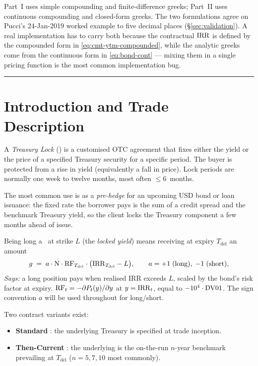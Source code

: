 \documentclass[11pt,a4paper]{article}
\newcommand{\Tlock}{\text{T-Lock}}
\newcommand{\RF}{\mathrm{RF}}
\newcommand{\Tdel}{T_{\mathrm{del}}}
\begin{document}
Part~I uses simple compounding and finite-difference greeks; Part~II
uses continuous compounding and closed-form greeks. The two
formulations agree on Pucci's 24-Jan-2019 worked example to five
decimal places (\S\ref{sec:validation}). A real implementation has to
carry both because the contractual $\mathrm{IRR}$ is defined by the compounded
form in \eqref{eq:cmt-ytm-compounded}, while the analytic greeks come
from the continuous form in \eqref{eq:bond-cont} --- mixing them in a
single pricing function is the most common implementation bug.

\tableofcontents
\bigskip\hrule

\section{Introduction and Trade Description}\label{sec:intro}

A \emph{Treasury Lock} (\Tlock) is a customised OTC agreement that
fixes either the yield or the price of a specified Treasury security
for a specific period. The buyer is protected from a rise in yield
(equivalently a fall in price). Lock periods are normally one week to
twelve months, most often $\le 6$~months.

The most common use is as a \emph{pre-hedge} for an upcoming USD bond
or loan issuance: the fixed rate the borrower pays is the sum of a
credit spread and the benchmark Treasury yield, so the client locks
the Treasury component a few months ahead of issue.

Being long a \Tlock\ at strike $L$ (the \emph{locked yield}) means
receiving at expiry $\Tdel$ an amount
\begin{equation}\label{eq:payoff-pucci}
g \;=\; a \cdot \mathrm{N} \cdot \RF_{\Tdel} \cdot \bigl( \IRR_{\Tdel} - L \bigr),
\qquad a = +1 \;\text{(long)},\; -1 \;\text{(short)},
\end{equation}
\textit{Says:} a long position pays when realised IRR exceeds $L$, scaled
by the bond's risk factor at expiry. $\RF_t = -\partial \Bond{t}{y}/\partial y$
at $y=\mathrm{IRR}_t$, equal to $-10^4 \cdot \mathrm{DV01}$. The sign convention $a$
will be used throughout for long/short.

Two contract variants exist:
\begin{itemize}[noitemsep]
\item \textbf{Standard \Tlock}: the underlying Treasury is specified at trade inception.
\item \textbf{Then-Current \Tlock}: the underlying is the on-the-run $n$-year
      benchmark prevailing at $\Tdel$ ($n=5,7,10$ most commonly).
\end{itemize}
\end{document}
